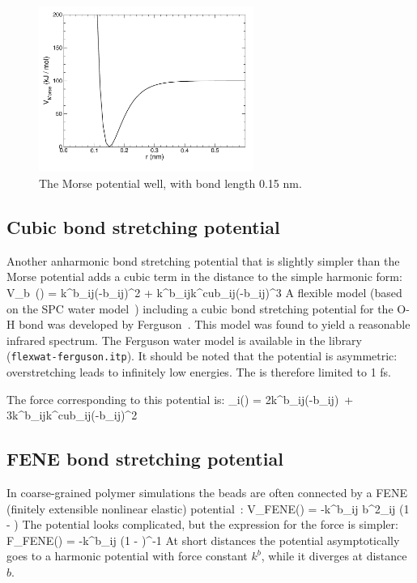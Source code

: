 \begin{figure}
\centerline{\includegraphics[width=7cm]{plots/f-morse}}
\caption{The Morse potential well, with bond length 0.15 nm.}
\label{fig:morse}
\end{figure}

\subsection{Cubic bond stretching potential}
\label{subsec:cubicbond}
Another anharmonic bond stretching potential that is slightly simpler
than the Morse potential adds a cubic term in the distance to the
simple harmonic form:
\beq
V_b~(\rij) = k^b_{ij}(\rij-b_{ij})^2 + k^b_{ij}k^{cub}_{ij}(\rij-b_{ij})^3
\eeq
A flexible  model (based on
the SPC water model~\cite{Berendsen81}) including 
a cubic bond stretching potential for the O-H bond
was developed by Ferguson~\cite{Ferguson95}. This model was found
to yield a reasonable infrared spectrum. The Ferguson water model is
available in the {\gromacs} library ({\tt flexwat-ferguson.itp}). 
It should be noted that the potential is asymmetric: overstretching leads to
infinitely low energies. The  is therefore
limited to 1 fs.

The force corresponding to this potential is:
\beq
{}_i(\rvij) = 2k^b_{ij}(\rij-b_{ij})~\rnorm + 3k^b_{ij}k^{cub}_{ij}(\rij-b_{ij})^2~\rnorm
\eeq

\subsection{FENE bond stretching potential}
\label{subsec:FENEbond}
In coarse-grained polymer simulations the beads are often connected
by a FENE (finitely extensible nonlinear elastic) potential~\cite{Warner72}:
\beq
V_{\mbox{\small FENE}}(\rij) =
  -\half k^b_{ij} b^2_{ij} \log\left(1 - \right)
\eeq
The potential looks complicated, but the expression for the force is simpler:
\beq
F_{\mbox{\small FENE}}(\rvij) =
  -k^b_{ij} \left(1 - \right)^{-1} \rvij
\eeq
At short distances the potential asymptotically goes to a harmonic
potential with force constant $k^b$, while it diverges at distance $b$.

